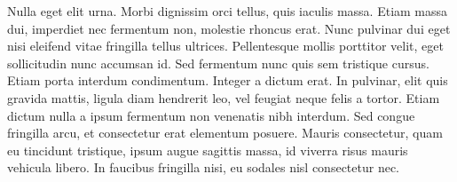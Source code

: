 Nulla eget elit urna. Morbi dignissim orci tellus, quis iaculis massa. Etiam
massa dui, imperdiet nec fermentum non, molestie rhoncus erat. Nunc pulvinar dui
eget nisi eleifend vitae fringilla tellus ultrices. Pellentesque mollis
porttitor velit, eget sollicitudin nunc accumsan id. Sed fermentum nunc quis sem
tristique cursus. Etiam porta interdum condimentum. Integer a dictum erat. In
pulvinar, elit quis gravida mattis, ligula diam hendrerit leo, vel feugiat neque
felis a tortor. Etiam dictum nulla a ipsum fermentum non venenatis nibh
interdum. Sed congue fringilla arcu, et consectetur erat elementum
posuere. Mauris consectetur, quam eu tincidunt tristique, ipsum augue sagittis
massa, id viverra risus mauris vehicula libero. In faucibus fringilla nisi, eu
sodales nisl consectetur nec.
